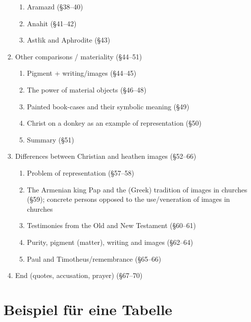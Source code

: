 \documentclass[
  english,
  a4paper,
  DIV=12,
  footlines=2.1,
  usegeometry=true]{scrartcl}
\providecommand{\tightlist}{%
  \setlength{\itemsep}{0pt}\setlength{\parskip}{0pt}}
\begin{document}
\begin{enumerate}
  \begin{enumerate}
  \tightlist
  \item
    \leavevmode\marginpar{\textcolor{parnum}{{[}15{]}}}Aramazd (§38--40)
  \item
    Anahit (§41--42)
  \item
    Astłik and Aphrodite (§43)
  \end{enumerate}
\item
  \leavevmode\marginpar{\textcolor{parnum}{{[}16{]}}}Other comparisons /
  materiality (§44--51)

  \begin{enumerate}
  \tightlist
  \item
    \leavevmode\marginpar{\textcolor{parnum}{{[}17{]}}}Pigment +
    writing/images (§44--45)
  \item
    The power of material objects (§46--48)
  \item
    Painted book-cases and their symbolic meaning (§49)
  \item
    Christ on a donkey as an example of representation (§50)
  \item
    Summary (§51)
  \end{enumerate}
\item
  \leavevmode\marginpar{\textcolor{parnum}{{[}18{]}}}Differences between
  Christian and heathen images (§52--66)

  \begin{enumerate}
  \tightlist
  \item
    \leavevmode\marginpar{\textcolor{parnum}{{[}19{]}}}Problem of
    representation (§57--58)
  \item
    The Armenian king Pap and the (Greek) tradition of images in
    churches (§59); concrete persons opposed to the use/veneration of
    images in churches
  \item
    Testimonies from the Old and New Testament (§60--61)
  \item
    Purity, pigment (matter), writing and images (§62--64)
  \item
    Paul and Timotheus/remembrance (§65--66)
  \end{enumerate}
\item
  \leavevmode\marginpar{\textcolor{parnum}{{[}20{]}}}End (quotes,
  accusation, prayer) (§67--70)
\end{enumerate}

\hypertarget{beispiel-fuxfcr-eine-tabelle}{%
\section{Beispiel für eine Tabelle}\label{beispiel-fuxfcr-eine-tabelle}}
\end{document}
